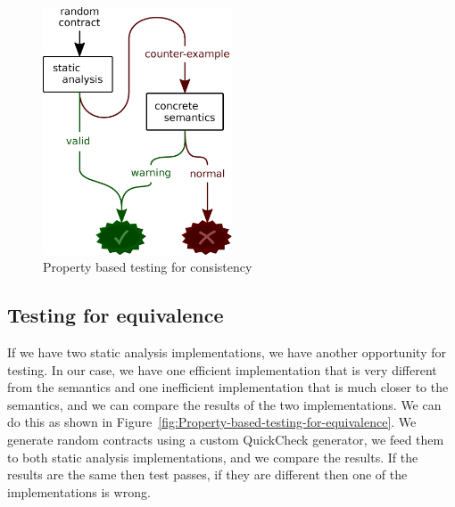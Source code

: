 \documentclass[english,runningheads]{llncs}
\begin{document}
\begin{figure}
\begin{centering}
\includegraphics[width=0.5\textwidth]{figures/consistency_property}
\par\end{centering}
\caption{Property based testing for consistency\label{fig:Property-based-testing-for-consistency}}

\end{figure}


\subsection{Testing for equivalence\label{subsec:Testing-for-equivalence} }

If we have two static analysis implementations, we have another opportunity
for testing. In our case, we have one efficient implementation that
is very different from the semantics and one inefficient implementation
that is much closer to the semantics, and we can compare the results of the
two implementations. We can do this as shown in Figure~\ref{fig:Property-based-testing-for-equivalence}.
We generate random contracts using a custom QuickCheck \cite{quickcheck} generator,
we feed them to both static analysis implementations, and we compare the results.
If the results are the same then test passes, if they are different then
one of the implementations is wrong.
\end{document}
